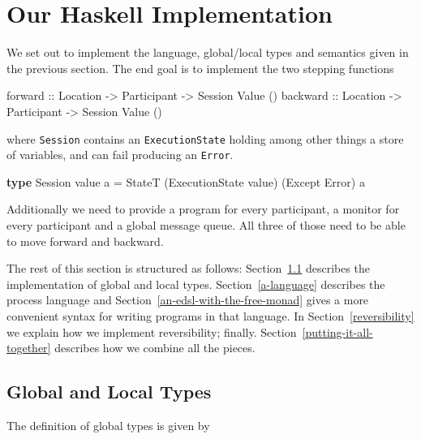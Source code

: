 \documentclass[runningheads]{llncs}
\newenvironment{Shaded}{}{}
\newcommand{\KeywordTok}[1]{\textcolor[rgb]{0.00,0.44,0.13}{\textbf{#1}}}
\newcommand{\DataTypeTok}[1]{\textcolor[rgb]{0.56,0.13,0.00}{#1}}
\newcommand{\OtherTok}[1]{\textcolor[rgb]{0.00,0.44,0.13}{#1}}
\newcommand{\FunctionTok}[1]{\textcolor[rgb]{0.02,0.16,0.49}{#1}}
\newcommand{\NormalTok}[1]{#1}
\begin{document}
\section{Our Haskell Implementation}\label{our-haskell-implementation}

We set out to implement the language, global/local types and semantics given in the previous section.
The end goal is to implement the two stepping functions

\begin{Shaded}
\begin{Highlighting}[]
\OtherTok{forward ::} \DataTypeTok{Location} \OtherTok{->} \DataTypeTok{Participant} \OtherTok{->} \DataTypeTok{Session} \DataTypeTok{Value}\NormalTok{ ()}
\OtherTok{backward ::} \DataTypeTok{Location} \OtherTok{->} \DataTypeTok{Participant} \OtherTok{->} \DataTypeTok{Session} \DataTypeTok{Value}\NormalTok{ ()}
\end{Highlighting}
\end{Shaded}
where \texttt{Session} contains an \texttt{ExecutionState} holding among
other things a store of variables, and can fail producing an
\texttt{Error}.

\begin{Shaded}
\begin{Highlighting}[]
\KeywordTok{type} \DataTypeTok{Session}\NormalTok{ value a }\FunctionTok{=} 
    \DataTypeTok{StateT}\NormalTok{ (}\DataTypeTok{ExecutionState}\NormalTok{ value) (}\DataTypeTok{Except} \DataTypeTok{Error}\NormalTok{) a}
\end{Highlighting}
\end{Shaded}

Additionally we need to provide a program for every participant, a
monitor for every participant and a global message queue. All three of
those need to be able to move forward and backward.

The rest of this section is structured as follows: Section~\ref{global-and-local-types} describes
the implementation of global and local types.
Section~\ref{a-language} describes the process language and 
Section~\ref{an-edsl-with-the-free-monad} gives a more convenient syntax for writing programs in
that language. 
In Section~\ref{reversibility} we explain how we implement reversibility; finally. 
Section~\ref{putting-it-all-together} describes how we combine all the pieces.


\subsection{Global and Local Types}\label{global-and-local-types}
The definition of global types is given by
\end{document}
